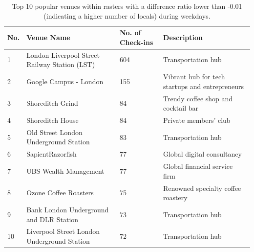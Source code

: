 \documentclass{article}
\theoremstyle{definition}
\theoremstyle{remark}
\begin{document}
\begin{table}[!h]
\centering
\caption{\label{tab:popular_venues_localspop_weekday}Top 10 popular venues within rasters with a difference ratio lower than -0.01 (indicating a higher number of locals) during weekdays.}
\begin{adjustbox}{max width=\textwidth, margin=0cm}
\begin{threeparttable}
\begin{tabular}{lp{5cm}lp{4cm}} \hline
No. & Venue Name & No. of Check-ins & Description \\ \hline
1 & London Liverpool Street Railway Station (LST) & 604 & Transportation hub \\
2 & Google Campus - London & 155 & Vibrant hub for tech startups and entrepreneurs \\
3 & Shoreditch Grind & 84 & Trendy coffee shop and cocktail bar \\
4 & Shoreditch House & 84 & Private members' club \\
5 & Old Street London Underground Station & 83 & Transportation hub \\
6 & SapientRazorfish & 77 & Global digital consultancy \\
7 & UBS Wealth Management & 77 & Global financial service firm \\
8 & Ozone Coffee Roasters & 75 & Renowned specialty coffee roastery \\
9 & Bank London Underground and DLR Station & 73 & Transportation hub \\
10 & Liverpool Street London Underground Station & 72 & Transportation hub \\ \hline
\end{tabular}
\end{threeparttable}
\end{adjustbox}
\end{table}
\end{document}
